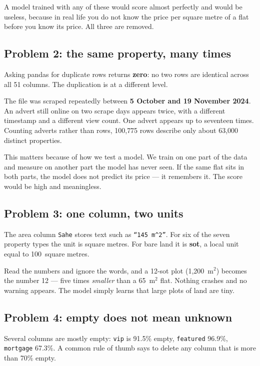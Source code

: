 \documentclass[10pt,twocolumn,a4paper]{article}
\begin{document}
A model trained with any of these would score almost perfectly and would
be useless, because in real life you do not know the price per square
metre of a flat before you know its price. All three are removed.

\subsection{Problem 2: the same property, many times}

Asking pandas for duplicate rows returns \textbf{zero}: no two rows are
identical across all 51 columns. The duplication is at a different level.

The file was scraped repeatedly between \textbf{5 October and 19 November
2024}. An advert still online on two scrape days appears twice, with a
different timestamp and a different view count. One advert appears up to
seventeen times. Counting adverts rather than rows, 100{,}775 rows
describe only about 63{,}000 distinct properties.

This matters because of how we test a model. We train on one part of the
data and measure on another part the model has never seen. If the same
flat sits in both parts, the model does not predict its price --- it
remembers it. The score would be high and meaningless.

\subsection{Problem 3: one column, two units}

The area column \texttt{Sahe} stores text such as
\texttt{``145 m$^2$''}. For six of the seven property types the unit is
square metres. For bare land it is \textbf{sot}, a local unit equal to
100~square metres.

Read the numbers and ignore the words, and a 12-sot plot (1{,}200~m$^2$)
becomes the number 12 --- five times \emph{smaller} than a 65~m$^2$ flat.
Nothing crashes and no warning appears. The model simply learns that
large plots of land are tiny.

\subsection{Problem 4: empty does not mean unknown}

Several columns are mostly empty: \texttt{vip} is 91.5\% empty,
\texttt{featured} 96.9\%, \texttt{mortgage} 67.3\%. A common rule of
thumb says to delete any column that is more than 70\% empty.
\end{document}
